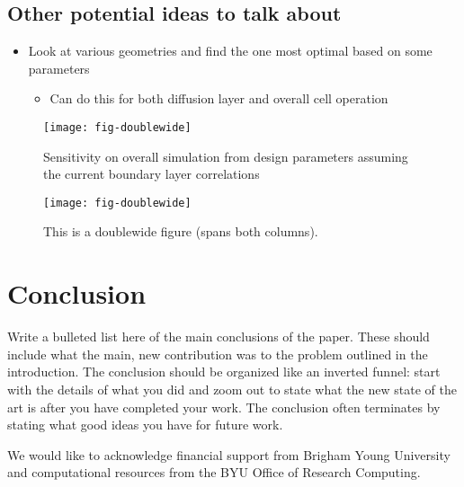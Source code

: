 \documentclass[journal=mamobx]{achemso}
\begin{document}
\subsection{Other potential ideas to talk about}
\begin{itemize}
  \item Look at various geometries and find the one most optimal based on some parameters
  \begin{itemize}
    \item Can do this for both diffusion layer and overall cell operation 
  \end{itemize}
\end{itemize}
\begin{figure*}[tbp]
  \texttt{[image: fig-doublewide]}
  \caption{Sensitivity on overall simulation from design parameters assuming the current boundary layer correlations}
  \label{fig-doublewide}
\end{figure*}



\begin{figure*}[tbp]
  \texttt{[image: fig-doublewide]}
  \caption{This is a doublewide figure (spans both columns).}
  \label{fig-doublewide}
\end{figure*}


\section{Conclusion}
Write a bulleted list here of the main conclusions of the paper.
These should include what the main, new contribution was to the problem outlined in the introduction.
The conclusion should be organized like an inverted funnel: start with the details of what you did and zoom out to state what the new state of the art is after you have completed your work.
The conclusion often terminates by stating what good ideas you have for future work.

\begin{acknowledgement}
We would like to acknowledge financial support from Brigham Young University and computational resources from the BYU Office of Research Computing.
\end{acknowledgement}

\clearpage

\end{document}

